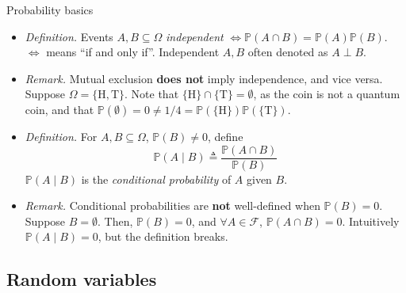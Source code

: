 \documentclass{beamer}
\numberwithin{equation}{section}
\begin{document}
\begin{frame}{Probability basics}
    \begin{itemize}
        \item
        \textit{Definition.} Events $ A, B \subseteq \Omega $
        \textit{independent} $ \Leftrightarrow \mathbb{P}(A \cap B) =
        \mathbb{P}(A)\mathbb{P}(B) $. $ \Leftrightarrow $ means ``if and only
        if''. Independent $ A, B $ often denoted as $ A \perp B $.

        \item
        \textit{Remark.} Mutual exclusion \textbf{does not} imply independence,
        and vice versa. Suppose $ \Omega = \{\text{H}, \text{T}\} $. Note that
        $ \{\text{H}\} \cap \{\text{T}\} = \emptyset $, as the coin is not a
        quantum coin, and that $ \mathbb{P}(\emptyset) = 0 \ne 1 / 4 =
        \mathbb{P}(\{\text{H}\})\mathbb{P}(\{\text{T}\}) $.

        \item
        \textit{Definition.} For $ A, B \subseteq \Omega $,
        $ \mathbb{P}(B) \ne 0 $, define
        \begin{equation*}
            \mathbb{P}(A \mid B) \triangleq \frac{\mathbb{P}(A \cap B)}{
                \mathbb{P}(B)            
            }
        \end{equation*}
        $ \mathbb{P}(A \mid B) $ is the \textit{conditional probability} of
        $ A $ given $ B $.

        \item
        \textit{Remark.} Conditional probabilities are \textbf{not}
        well-defined when $ \mathbb{P}(B) = 0 $. Suppose $ B = \emptyset $.
        Then, $ \mathbb{P}(B) = 0 $, and $ \forall A \in \mathcal{F} $,
        $ \mathbb{P}(A \cap B) = 0 $. Intuitively
        $ \mathbb{P}(A \mid B) = 0 $, but the definition breaks.
    \end{itemize}
\end{frame}

\subsection{Random variables}
\end{document}
